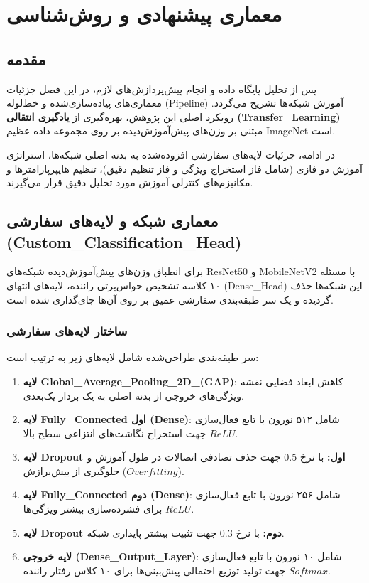 \documentclass{report}
\begin{document}
 	
 	
 	
 	
 	
 	
 	\chapter{معماری پیشنهادی و روش‌شناسی}
 	
 	\section{مقدمه}
 	پس از تحلیل پایگاه داده و انجام پیش‌پردازش‌های لازم، در این فصل جزئیات معماری‌های پیاده‌سازی‌شده و خط‌لوله (Pipeline) آموزش شبکه‌ها تشریح می‌گردد. رویکرد اصلی این پژوهش، بهره‌گیری از \textbf{یادگیری انتقالی (Transfer\_Learning)} مبتنی بر وزن‌های پیش‌آموزش‌دیده بر روی مجموعه داده عظیم ImageNet است.
 	
 	در ادامه، جزئیات لایه‌های سفارشی افزوده‌شده به بدنه اصلی شبکه‌ها، استراتژی آموزش دو فازی (شامل فاز استخراج ویژگی و فاز تنظیم دقیق)، تنظیم هایپرپارامترها و مکانیزم‌های کنترلی آموزش مورد تحلیل دقیق قرار می‌گیرند.
 	
 	\section{معماری شبکه و لایه‌های سفارشی (Custom\_Classification\_Head)}
 	برای انطباق وزن‌های پیش‌آموزش‌دیده شبکه‌های ResNet50 و MobileNetV2 با مسئله ۱۰ کلاسه تشخیص حواس‌پرتی راننده، لایه‌های انتهای (Dense\_Head) این شبکه‌ها حذف گردیده و یک سر طبقه‌بندی سفارشی عمیق بر روی آن‌ها جای‌گذاری شده است.
 	
 	\subsection{ساختار لایه‌های سفارشی}
 	سر طبقه‌بندی طراحی‌شده شامل لایه‌های زیر به ترتیب است:
 	\begin{enumerate}
 		\item \textbf{لایه Global\_Average\_Pooling\_2D\_(GAP)}: کاهش ابعاد فضایی نقشه ویژگی‌های خروجی از بدنه اصلی به یک بردار یک‌بعدی.
 		\item \textbf{لایه Fully\_Connected اول (Dense)}: شامل ۵۱۲ نورون با تابع فعال‌سازی $ReLU$ جهت استخراج نگاشت‌های انتزاعی سطح بالا.
 		\item \textbf{لایه Dropout اول:} با نرخ $0.5$ جهت حذف تصادفی اتصالات در طول آموزش و جلوگیری از بیش‌برازش ($Overfitting$).
 		\item \textbf{لایه Fully\_Connected دوم (Dense)}: شامل ۲۵۶ نورون با تابع فعال‌سازی $ReLU$ برای فشرده‌سازی بیشتر ویژگی‌ها.
 		\item \textbf{لایه Dropout دوم:} با نرخ $0.3$ جهت تثبیت بیشتر پایداری شبکه.
 		\item \textbf{لایه خروجی (Dense\_Output\_Layer)}: شامل ۱۰ نورون با تابع فعال‌سازی $Softmax$ جهت تولید توزیع احتمالی پیش‌بینی‌ها برای ۱۰ کلاس رفتار راننده.
 	\end{enumerate}
 	
\end{document}

